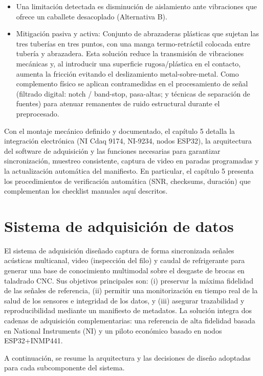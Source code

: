 \documentclass[12pt, letterpaper]{report}
\begin{document}
\begin{itemize}[leftmargin=1.77cm]
\item Una limitación detectada es disminución de aislamiento ante vibraciones que ofrece un caballete desacoplado (Alternativa B).
\item Mitigación pasiva y activa: Conjunto de abrazaderas plásticas que sujetan las tres tuberías en tres puntos, con una manga termo-retráctil colocada entre tubería y abrazadera. Esta solución reduce la transmisión de vibraciones mecánicas y, al introducir una superficie rugosa/plástica en el contacto, aumenta la fricción evitando el deslizamiento metal-sobre-metal. Como complemento físico se aplican contramedidas en el procesamiento de señal (filtrado digital: notch / band-stop, pasa-altas; y técnicas de separación de fuentes) para atenuar remanentes de ruido estructural durante el preprocesado.
\end{itemize}


Con el montaje mecánico definido y documentado, el capítulo 5 detalla la integración electrónica (NI Cdaq 9174, NI-9234, nodos ESP32), la arquitectura del software de adquisición y las funciones necesarias para garantizar sincronización, muestreo consistente, captura de video en paradas programadas y la actualización automática del manifiesto. En particular, el capítulo 5 presenta los procedimientos de verificación automática (SNR, checksums, duración) que complementan los checklist manuales aquí descritos.

\clearpage
\chapter{Sistema de adquisición de datos}

El sistema de adquisición diseñado captura de forma sincronizada señales acústicas multicanal, video (inspección del filo) y caudal de refrigerante para generar una base de conocimiento multimodal sobre el desgaste de brocas en taladrado CNC. Sus objetivos principales son: (i) preservar la máxima fidelidad de las señales de referencia, (ii) permitir una monitorización en tiempo real de la salud de los sensores e integridad de los datos, y (iii) asegurar trazabilidad y reproducibilidad mediante un manifiesto de metadatos. La solución integra dos cadenas de adquisición complementarias: una referencia de alta fidelidad basada en National Instruments (NI) y un piloto económico basado en nodos ESP32+INMP441.

A continuación, se resume la arquitectura y las decisiones de diseño adoptadas para cada subcomponente del sistema.
\end{document}
